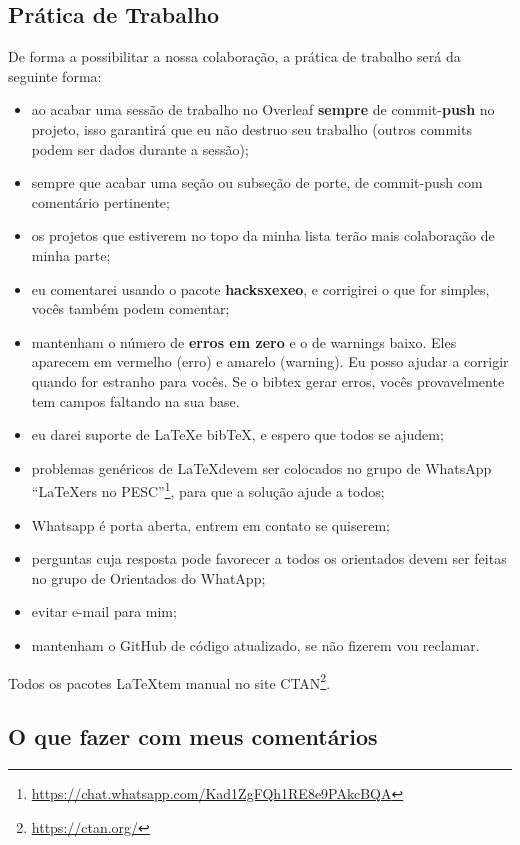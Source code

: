 \documentclass{article}
\begin{document}
\subsection{Prática de Trabalho}

De forma a possibilitar a nossa colaboração, a prática de trabalho será da seguinte forma:

\begin{itemize}
    \item ao acabar uma sessão de trabalho no Overleaf \textbf{sempre} de commit-\textbf{push} no projeto, isso garantirá que eu não destruo seu trabalho (outros commits podem ser dados durante a sessão);
    \item sempre que acabar uma seção ou subseção de porte, de commit-push com comentário pertinente;
    \item os projetos que estiverem no topo da minha lista terão mais colaboração de minha parte;
    \item eu comentarei usando o pacote \textbf{hacksxexeo}, e corrigirei o que for simples, vocês também podem comentar;
    \item mantenham o número de \textbf{erros em zero} e o de warnings baixo. Eles aparecem em vermelho (erro) e amarelo (warning). Eu posso ajudar a corrigir quando for estranho para vocês. Se o bibtex gerar erros, vocês provavelmente tem campos faltando na sua base.
    \item eu darei suporte de \LaTeX e bib\TeX, e espero que todos se ajudem;
    \item problemas genéricos de \LaTeX devem ser colocados no grupo de WhatsApp ``\LaTeX ers no PESC''\footnote{\url{https://chat.whatsapp.com/Kad1ZgFQh1RE8e9PAkcBQA}}, para que a solução ajude a todos;
    \item Whatsapp é porta aberta, entrem em contato se quiserem;
    \item perguntas cuja resposta pode favorecer a todos os orientados devem ser feitas no grupo de Orientados do WhatApp;
    \item evitar e-mail para mim;
    \item mantenham o GitHub de código atualizado, se não fizerem vou reclamar.
\end{itemize}

Todos os pacotes \LaTeX tem manual no site CTAN\footnote{\url{https://ctan.org/}}.

\subsection{O que fazer com meus comentários}
\end{document}
